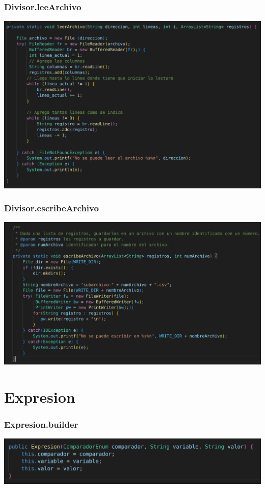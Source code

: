 \documentclass{beamer}
\begin{document}
\begin{frame}
\frametitle{Divisor.leeArchivo}
\includegraphics[width=\linewidth]{divisor_leearchivo}
\end{frame}

\begin{frame}
\frametitle{Divisor.escribeArchivo}
\includegraphics[width=\linewidth]{divisor_escribearchivo}
\end{frame}

\section{Expresion}

\begin{frame}
\frametitle{Expresion.builder}
\includegraphics[width=\linewidth]{expresion_builder}
\end{frame}
\end{document}
